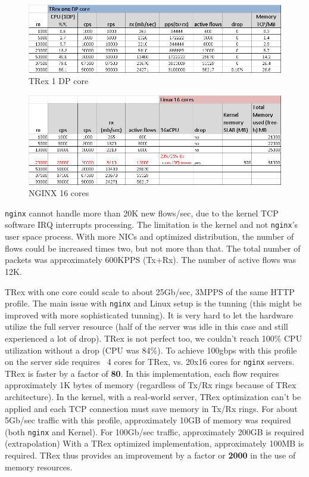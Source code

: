 \documentclass[letterpaper]{article}
\begin{document}
\begin{figure}[h]
\includegraphics[width=0.5
\textwidth, center]{nginx_result_trex1.png}
\caption{TRex 1 DP core}
\label{fig:trex_nginx_r1}
\end{figure}

\begin{figure}[h]
\includegraphics[width=0.5
\textwidth, center]{nginx_result_linux1.png}
\caption{NGINX 16 cores}
\label{fig:trex_nginx_r2}
\end{figure}

\texttt{nginx} cannot handle more than 20K new flows/sec, due to the kernel TCP software IRQ interrupts processing. 
The limitation is the kernel and not \texttt{nginx}'s user space process.
With more NICs and optimized distribution, the number of flows could be increased times two, but not more than that. 
The total number of packets was approximately 600KPPS (Tx+Rx). The number of active flows was 12K.

TRex with one core could scale to about 25Gb/sec, 3MPPS of the same HTTP profile.
The main issue with \texttt{nginx} and Linux setup is the tunning (this might be improved with more sophisticated tunning). 
It is very hard to let the hardware utilize the full server resource (half of the server was idle in this case and still experienced a lot of drop). 
TRex is not perfect too, we couldn't reach 100\% CPU utilization without a drop (CPU was 84\%). To achieve 100gbps with this profile on the server side requires ~4 cores for TRex, vs. 20x16 cores for \texttt{nginx} servers. 
TRex is faster by a factor of \textbf{80}. In this implementation, each flow requires approximately 1K bytes of memory (regardless of Tx/Rx rings because of TRex architecture). 
In the kernel, with a real-world server, TRex optimization can't be applied and each TCP connection must save memory in Tx/Rx rings.
For about 5Gb/sec traffic with this profile, approximately 10GB of memory was required (both \texttt{nginx} and Kernel). For 100Gb/sec traffic, approximately 200GB is required (extrapolation)  With a TRex optimized implementation, approximately 100MB is required. 
TRex thus provides an improvement by a factor or \textbf{2000} in the use of memory resources.
\end{document}

